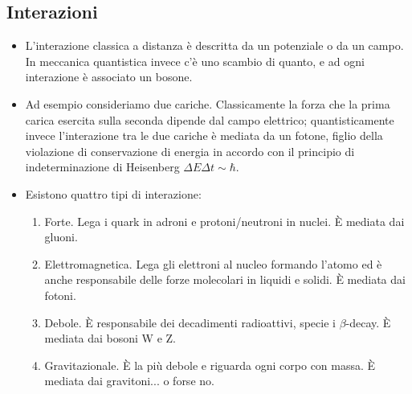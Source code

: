 \subsection{Interazioni}
\begin{itemize}
    \item L'interazione classica a distanza è descritta da un potenziale o da un campo. In meccanica quantistica invece c'è uno scambio di quanto, e ad ogni interazione è associato un bosone.
    \item Ad esempio consideriamo due cariche. Classicamente la forza che la prima carica esercita sulla seconda dipende dal campo elettrico; quantisticamente invece l'interazione tra le due cariche è mediata da un fotone, figlio della violazione di conservazione di energia in accordo con il principio di indeterminazione di Heisenberg $\Delta E\Delta t\sim\hbar$.
    \item Esistono quattro tipi di interazione: 
    \begin{enumerate}
        \item Forte. Lega i quark in adroni e protoni/neutroni in nuclei. È mediata dai gluoni.
        \item Elettromagnetica. Lega gli elettroni al nucleo formando l'atomo ed è anche responsabile delle forze molecolari in liquidi e solidi. È mediata dai fotoni.
        \item Debole. È responsabile dei decadimenti radioattivi, specie i $\beta$-decay. È mediata dai bosoni W e Z.
        \item Gravitazionale. È la più debole e riguarda ogni corpo con massa. È mediata dai gravitoni... o forse no.
    \end{enumerate}
\end{itemize}